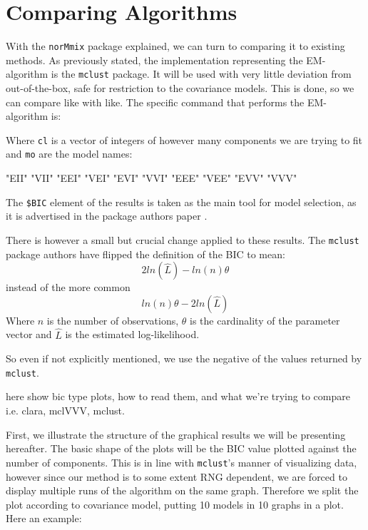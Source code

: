 \chapter{Comparing Algorithms}


With the {\tt norMmix} package explained, we can turn to comparing it to 
existing methods. As previously stated, the implementation representing the 
EM-algorithm is the {\tt mclust} package. It will be used with very little 
deviation from out-of-the-box, safe for restriction to the covariance models.
This is done, so we can compare like with like.
The specific command that performs the EM-algorithm is:
\begin{Schunk}
\end{Schunk}
Where {\tt cl} is a vector of integers of however many components we are trying to fit and {\tt mo} are the model names:
\begin{Schunk}
\begin{Soutput}
 [1] "EII" "VII" "EEI" "VEI" "EVI" "VVI" "EEE" "VEE" "EVV" "VVV"
\end{Soutput}
\end{Schunk}
The {\tt \$BIC} element of the results is taken as the main tool for model 
selection, as it is advertised in the package authors paper \cite{Scr16}.

There is however a small but crucial change applied to these results.
The {\tt mclust} package authors have flipped the definition of the BIC to mean:
\[ 2 ln(\hat{L}) - ln(n) \theta\]
instead of the more common
\[ ln(n) \theta - 2 ln(\hat{L}) \]
Where $n$ is the number of observations, $\theta$ is the cardinality of the 
parameter vector and $$ is the estimated log-likelihood.

So even if not explicitly mentioned, we use the negative of the values returned
by {\tt mclust}.


here show bic type plots, how to read them, and what we're trying to compare
i.e. clara, mclVVV, mclust.

First, we illustrate the structure of the graphical results we will be 
presenting hereafter. The basic shape of the plots will be the BIC value 
plotted against the number of components. This is in line with {\tt mclust}'s
manner of visualizing data, however since our method is to some extent RNG 
dependent, we are forced to display multiple runs of the algorithm on the same
graph. Therefore we split the plot according to covariance model, putting 10
models in 10 graphs in a plot. Here an example:


